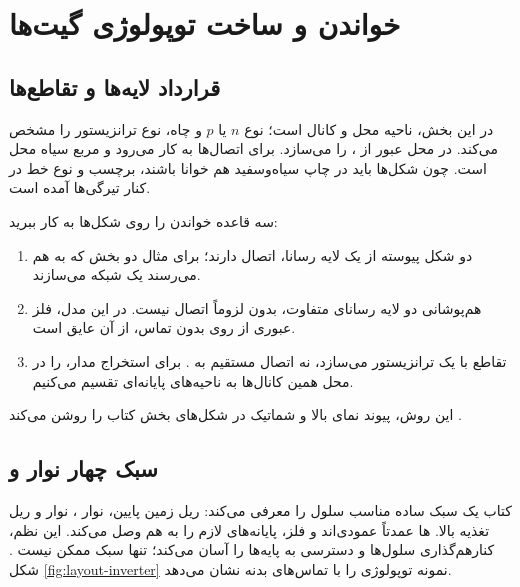 \section{خواندن و ساخت توپولوژی گیت‌ها}
\label{sec:layout-gates}
\subsection{قرارداد لایه‌ها و تقاطع‌ها}
در این بخش،  ناحیه محل  و کانال است؛
نوع \(n\) یا \(p\) و چاه، نوع ترانزیستور را مشخص می‌کند.
 در محل عبور از ،  را می‌سازد.
 برای اتصال‌ها به کار می‌رود و مربع سیاه محل  است.
چون شکل‌ها باید در چاپ سیاه‌وسفید هم خوانا باشند، برچسب و نوع خط در کنار تیرگی‌ها آمده است.

سه قاعده خواندن را روی شکل‌ها به کار ببرید:
\begin{enumerate}
\item دو شکل پیوسته از یک لایه رسانا، اتصال دارند؛ برای مثال دو بخش
 که به هم می‌رسند یک شبکه می‌سازند.
\item هم‌پوشانی دو لایه رسانای متفاوت، بدون  لزوماً اتصال نیست.
در این مدل، فلز عبوری از روی  بدون تماس، از آن عایق است.
\item تقاطع  با  یک ترانزیستور می‌سازد، نه اتصال مستقیم
 به . برای استخراج مدار،  را در محل
همین کانال‌ها به ناحیه‌های پایانه‌ای تقسیم می‌کنیم.
\end{enumerate}
این روش، پیوند نمای بالا و شماتیک در شکل‌های بخش  کتاب را روشن می‌کند
\cite{weste}.

\subsection{سبک چهار نوار و }
کتاب یک سبک ساده مناسب سلول را معرفی می‌کند: ریل زمین پایین، نوار
، نوار  و ریل تغذیه بالا.
ها عمدتاً عمودی‌اند و فلز، پایانه‌های لازم را به هم وصل می‌کند.
این نظم، کنارهم‌گذاری سلول‌ها و دسترسی به پایه‌ها را آسان می‌کند؛
تنها سبک ممکن  نیست
\cite[بخش ]{weste}.
شکل \ref{fig:layout-inverter} نمونه توپولوژی  را با تماس‌های بدنه نشان می‌دهد.

